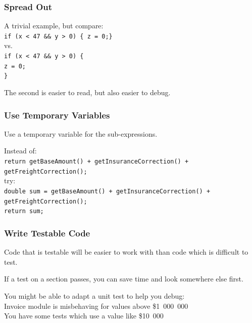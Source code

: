 \begin{frame}
\frametitle{Spread Out}
\begin{changemargin}{1cm}

A trivial example, but compare:\\
\texttt{if (x < 47 \&\& y > 0) \{ z = 0;\} }\\
vs.\\
\texttt{if (x < 47 \&\& y > 0) \{\\ \hspace*{0.5cm} z = 0; \\ \} }

The second is easier to read, but also easier to debug. 

\end{changemargin}
\end{frame}

\begin{frame}
\frametitle{Use Temporary Variables}
\begin{changemargin}{1cm}
Use a temporary variable for the sub-expressions.

Instead of:\\
\texttt{return getBaseAmount() + getInsuranceCorrection() + getFreightCorrection();}\\
try:\\
\texttt{double sum = getBaseAmount() + getInsuranceCorrection() + getFreightCorrection();\\ return sum;}\\


\end{changemargin}
\end{frame}

\begin{frame}
\frametitle{Write Testable Code}
\begin{changemargin}{1cm}
Code that is testable will be easier to work with than code which is difficult to test.

If a test on a section passes, you can save time and look somewhere else first.

You might be able to adapt a unit test to help you debug:\\
\quad Invoice module is misbehaving for values above \$1~000~000 \\
\quad You have some tests which use a value like \$10~000 
\end{changemargin}
\end{frame}

